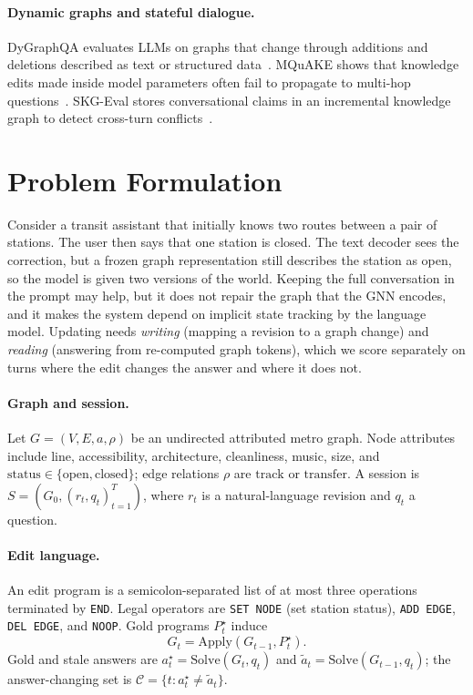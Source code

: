 \documentclass[11pt]{article}
\begin{document}
\paragraph{Dynamic graphs and stateful dialogue.}
DyGraphQA evaluates LLMs on graphs that change through additions and deletions described as text or structured data~\cite{comrie2025dygraphqa}.
MQuAKE shows that knowledge edits made inside model parameters often fail to propagate to multi-hop questions~\cite{zhong-etal-2023-mquake}.
SKG-Eval stores conversational claims in an incremental knowledge graph to detect cross-turn conflicts~\cite{shil2026skgeval}.

\section{Problem Formulation}
\label{sec:problem}

Consider a transit assistant that initially knows two routes between a pair of stations.
The user then says that one station is closed.
The text decoder sees the correction, but a frozen graph representation still describes the station as open, so the model is given two versions of the world.
Keeping the full conversation in the prompt may help, but it does not repair the graph that the GNN encodes, and it makes the system depend on implicit state tracking by the language model.
Updating needs \emph{writing} (mapping a revision to a graph change) and \emph{reading} (answering from re-computed graph tokens), which we score separately on turns where the edit changes the answer and where it does not.

\paragraph{Graph and session.}
Let $G=(V,E,a,\rho)$ be an undirected attributed metro graph.
Node attributes include line, accessibility, architecture, cleanliness, music, size, and $\mathrm{status}\in\{\mathrm{open},\mathrm{closed}\}$; edge relations $\rho$ are $\mathrm{track}$ or $\mathrm{transfer}$.
A session is $S=(G_0,(r_t,q_t)_{t=1}^{T})$, where $r_t$ is a natural-language revision and $q_t$ a question.

\paragraph{Edit language.}
An edit program is a semicolon-separated list of at most three operations terminated by \texttt{END}.
Legal operators are \texttt{SET NODE} (set station status), \texttt{ADD EDGE}, \texttt{DEL EDGE}, and \texttt{NOOP}.
Gold programs $P_t^\star$ induce
\begin{equation}
G_t=\mathrm{Apply}(G_{t-1},P_t^\star).
\end{equation}
Gold and stale answers are $a_t^\star=\mathrm{Solve}(G_t,q_t)$ and $\tilde{a}_t=\mathrm{Solve}(G_{t-1},q_t)$; the answer-changing set is $\mathcal{C}=\{t:a_t^\star\neq\tilde{a}_t\}$.
\end{document}
